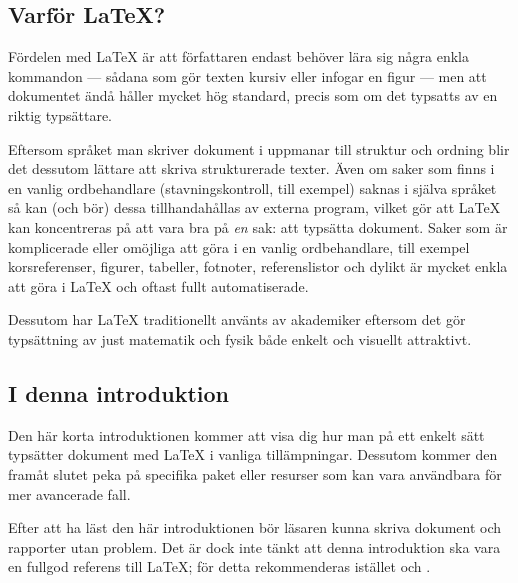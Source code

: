 \documentclass[lang=sv,ptsize=10pt,font=none,nomath,titles=bf,../../a4.tex]{subfiles}
\begin{document}
{}
\subsection*{Varför \LaTeX?}
Fördelen med \LaTeX{} är att författaren endast behöver lära sig några
enkla kommandon — sådana som gör texten kursiv eller infogar en figur
— men att dokumentet ändå håller mycket hög standard, precis som om
det typsatts av en riktig typsättare.

Eftersom språket man skriver dokument i uppmanar till struktur och ordning
blir det dessutom lättare att skriva strukturerade texter. Även om saker
som finns i en vanlig ordbehandlare (stavningskontroll, till exempel) saknas i
själva språket så kan (och bör) dessa tillhandahållas av externa program,
vilket gör att \LaTeX{} kan koncentreras på att vara bra på \emph{en} sak:
att typsätta dokument. Saker som är komplicerade eller omöjliga att göra
i en vanlig ordbehandlare, till exempel korsreferenser, figurer, tabeller,
fotnoter, referenslistor och dylikt är mycket enkla att göra i \LaTeX{}
och oftast fullt automatiserade.

Dessutom har \LaTeX{} traditionellt använts av akademiker eftersom det gör 
typsättning av just matematik och fysik både enkelt och visuellt attraktivt. 

\vspace{-1em}
\subsection*{I denna introduktion}
Den här korta introduktionen kommer att visa dig hur man på ett enkelt
sätt typsätter dokument med \LaTeX{} i vanliga tillämpningar.
Dessutom kommer den framåt slutet peka på specifika paket eller
resurser som kan vara användbara för mer avancerade fall.

Efter att ha läst den här introduktionen bör läsaren kunna skriva
dokument och rapporter utan problem. Det är dock inte tänkt att denna
introduktion ska vara en fullgod referens till \LaTeX; för detta
rekommenderas istället \textcite{Lamport94} och
\textcite{Mittelbach04}.
\end{document}
